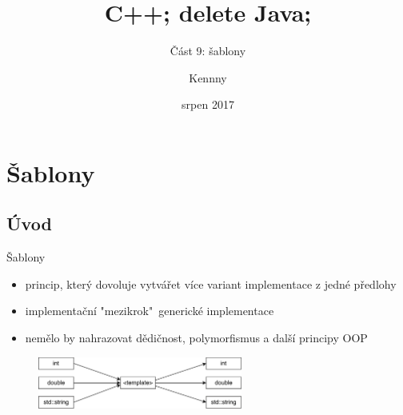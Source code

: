 \documentclass{beamer}
\begin{document}
\title{C++; delete Java;}
\subtitle{Část 9: šablony}
\author{Kennny}
\date{srpen 2017}

\frame{\titlepage}


\newenvironment{xframe}[1][]
  {\begin{frame}[fragile,environment=xframe,#1]}
  {\end{frame}}

\section{Šablony}
\subsection{Úvod}



\begin{xframe}{Šablony}
	\begin{itemize}
		\item princip, který dovoluje vytvářet více variant implementace z jedné předlohy
		\item implementační "mezikrok"~generické implementace
		\item nemělo by nahrazovat dědičnost, polymorfismus a další principy OOP
	\end{itemize}
	
	\begin{figure}
		\centering
		\includegraphics[width=0.6\textwidth]{templschema.pdf}
	\end{figure}
\end{xframe}
\end{document}
